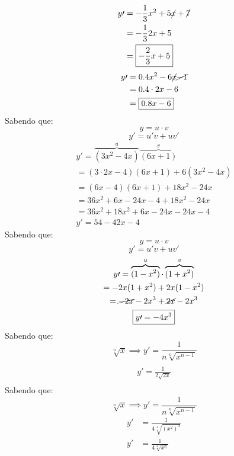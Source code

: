 \documentclass{jhwhw}
\begin{document}
\begin{align*}
    y\prime & = -\frac{1}{3} x^2 + 5\cancel{x} + \cancel{7} \\
            & = -\frac{1}{3} 2x + 5                         \\
            & = \boxed{-\frac{2}{3} x + 5}
\end{align*}
\begin{align*}
    y\prime & = 0.4 x^2 -6\cancel{x} \cancel{-1} \\
            & = 0.4\cdot2x -6                    \\
            & = \boxed{0.8x - 6}
\end{align*}
Sabendo que:
\[
    y = u \cdot v
\]
\[
    y\prime = u\prime v + u v\prime
\]
\begin{multline*}
    y\prime = \overbrace{(3x^2 - 4x)}^{u}\overbrace{(6x+1)}^{v} \\
    = (3 \cdot 2x - 4)(6x+1) + 6(3x^2-4x) \\
    = (6x-4)(6x+1) + 18x^2 - 24x \\
    = 36x^2 + 6x -24x - 4 + 18x^2 - 24x \\
    = 36x^2 + 18x^2 +6x - 24x - 24x - 4 \\
    \boxed{y\prime = 54 - 42x - 4}
\end{multline*}
Sabendo que: \[
    y = u \cdot v\]\[
    y\prime = u\prime v + u v\prime
\]
\begin{multline*}
    y\prime = \overbrace{(1-x^2)}^{u} \cdot \overbrace{(1+x^2)}^{v} \\
    = -2x(1+x^2) + 2x(1-x^2) \\
    = \cancel{-2x} - 2x^3 + \cancel{2x} - 2x^3 \\
    \boxed{y\prime= -4x^3}
\end{multline*}
Sabendo que: \[
    \sqrt[n]{x} \implies y\prime = \frac{1}{n\sqrt[n]{x^{n-1}}}
\]
\begin{multline*}
    \\\boxed{y\prime = \frac{1}{2\sqrt{2x}}}\\
\end{multline*}
Sabendo que: \[
    \sqrt[n]{x} \implies y\prime = \frac{1}{n\sqrt[n]{x^{n-1}}}
\]
\begin{align*}
    y\prime & = \frac{1}{4\sqrt[4]{(x^2)^{3}}} \\
    y\prime & = \frac{1}{4\sqrt[4]{x^6}}
\end{align*}
\end{document}
